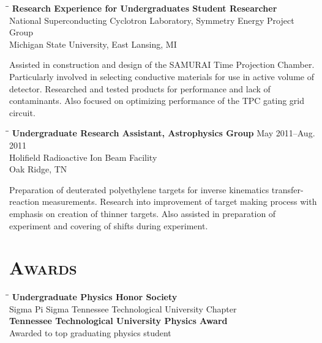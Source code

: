 \documentclass[10pt]{res} %
\begin{document}
\begin{resume}
\vspace{-0.1in}
\begin{tabbing}
\hspace{2.3in}\= \hspace{2.5in}\= \kill %
  \textbf{Research Experience for Undergraduates Student Researcher} \> \\
National Superconducting Cyclotron Laboratory, Symmetry Energy Project Group \\
Michigan State University, East Lansing, MI \\
\end{tabbing}\vspace{-20pt}      %

Assisted in construction and design of the SAMURAI Time Projection Chamber. 
Particularly involved in selecting conductive materials for use in active 
volume of detector. Researched and tested products for performance and lack 
of contaminants. Also focused on optimizing performance of the TPC gating grid circuit.

\begin{tabbing}
\hspace{2.3in}\= \hspace{2.5in}\= \kill %
\textbf{Undergraduate Research Assistant, Astrophysics Group} \>\> May 2011--Aug. 2011\\
Holifield Radioactive Ion Beam Facility \\
Oak Ridge, TN \\
\end{tabbing}\vspace{-20pt}      %

Preparation of deuterated polyethylene targets for inverse kinematics 
transfer-reaction measurements. Research into improvement of 
target making process with emphasis on creation of thinner targets. 
Also assisted in preparation of experiment and covering of shifts 
during experiment.

\section{\textsc{Awards}}
\vspace{-0.1in}
\begin{tabbing}
\hspace{2.3in}\= \hspace{2.6in}\= \kill %
\textbf{Undergraduate Physics Honor Society} \>\\
Sigma Pi Sigma Tennessee Technological University Chapter 	    \\
\textbf{Tennessee Technological University Physics Award} 				\>\>{Spring 2013 }\\
Awarded to top graduating physics student \\
\end{tabbing}\vspace{-20pt}      %


\end{resume}
\end{document}
